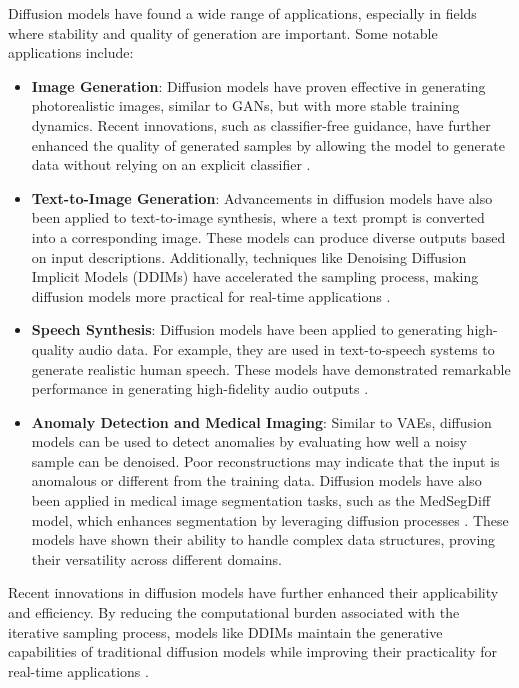 Diffusion models have found a wide range of applications, especially in fields where stability and quality of generation are important. Some notable applications include:
\begin{itemize}
    \item \textbf{Image Generation}: Diffusion models have proven effective in generating photorealistic images, similar to GANs, but with more stable training dynamics. Recent innovations, such as classifier-free guidance, have further enhanced the quality of generated samples by allowing the model to generate data without relying on an explicit classifier \citep{10.48550/arxiv.2207.12598}.
    \item \textbf{Text-to-Image Generation}: Advancements in diffusion models have also been applied to text-to-image synthesis, where a text prompt is converted into a corresponding image. These models can produce diverse outputs based on input descriptions. Additionally, techniques like Denoising Diffusion Implicit Models (DDIMs) have accelerated the sampling process, making diffusion models more practical for real-time applications \citep{10.48550/arxiv.2010.02502}\citep{10.48550/arxiv.2111.15640}.
    \item \textbf{Speech Synthesis}: Diffusion models have been applied to generating high-quality audio data. For example, they are used in text-to-speech systems to generate realistic human speech. These models have demonstrated remarkable performance in generating high-fidelity audio outputs \citep{10.48550/arxiv.2201.11972}\citep{10.48550/arxiv.2009.09761}.
    \item \textbf{Anomaly Detection and Medical Imaging}: Similar to VAEs, diffusion models can be used to detect anomalies by evaluating how well a noisy sample can be denoised. Poor reconstructions may indicate that the input is anomalous or different from the training data. Diffusion models have also been applied in medical image segmentation tasks, such as the MedSegDiff model, which enhances segmentation by leveraging diffusion processes \citep{10.48550/arxiv.2211.00611}. These models have shown their ability to handle complex data structures, proving their versatility across different domains.
\end{itemize}

Recent innovations in diffusion models have further enhanced their applicability and efficiency. By reducing the computational burden associated with the iterative sampling process, models like DDIMs maintain the generative capabilities of traditional diffusion models while improving their practicality for real-time applications \citep{10.48550/arxiv.2101.02388}.
